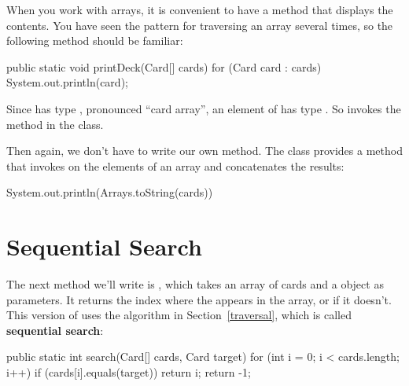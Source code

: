 When you work with arrays, it is convenient to have a method that displays the contents.
You have seen the pattern for traversing an array several times, so the following method should be familiar:



\begin{code}
public static void printDeck(Card[] cards) {
    for (Card card : cards) {
        System.out.println(card);
    }
}
\end{code}


Since  has type , pronounced ``card array'', an element of  has type .
So  invokes the  method in the  class.

Then again, we don't have to write our own  method.
The  class provides a  method that invokes  on the elements of an array and concatenates the results:

\begin{code}
System.out.println(Arrays.toString(cards))
\end{code}


\section{Sequential Search}


The next method we'll write is , which takes an array of cards and a  object as parameters.
It returns the index where the  appears in the array, or  if it doesn't.
This version of  uses the algorithm in Section~\ref{traversal}, which is called {\bf sequential search}:


\begin{code}
public static int search(Card[] cards, Card target) {
    for (int i = 0; i < cards.length; i++) {
        if (cards[i].equals(target)) {
            return i;
        }
    }
    return -1;
}
\end{code}

